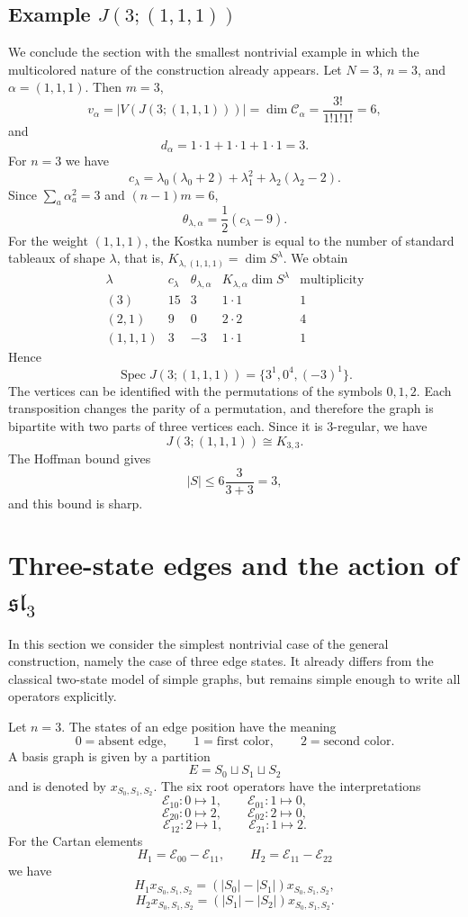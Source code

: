 \documentclass[12pt,reqno]{amsart}
\begin{document}
\subsection{Example $J(3;(1,1,1))$}
We conclude the section with the smallest nontrivial example in which the
multicolored nature of the construction already appears.
Let $N=3$, $n=3$, and $\alpha=(1,1,1)$. Then $m=3$,
$$
v_\alpha
=
|V(J(3;(1,1,1)))|
=
\dim\mathcal C_\alpha
=
\frac{3!}{1!1!1!}=6,
$$
and
$$
d_\alpha=1\cdot1+1\cdot1+1\cdot1=3.
$$
For $n=3$ we have
$$
c_\lambda
=
\lambda_0(\lambda_0+2)+
\lambda_1^2+
\lambda_2(\lambda_2-2).
$$
Since $\sum_a\alpha_a^2=3$ and $(n-1)m=6$,
$$
\theta_{\lambda,\alpha}
=
\frac12(c_\lambda-9).
$$
For the weight $(1,1,1)$, the Kostka number is equal to the number of
standard tableaux of shape $\lambda$, that is,
$K_{\lambda,(1,1,1)}=\dim S^\lambda$. We obtain
$$
\begin{array}{c|c|c|c|c}
\lambda & c_\lambda & \theta_{\lambda,\alpha}
& K_{\lambda,\alpha}\dim S^\lambda & \text{multiplicity}\\ \hline
(3) & 15 & 3 & 1\cdot1 & 1\\
(2,1) & 9 & 0 & 2\cdot2 & 4\\
(1,1,1) & 3 & -3 & 1\cdot1 & 1
\end{array}
$$
Hence
$$
\operatorname{Spec}J(3;(1,1,1))
=
\{3^1,0^4,(-3)^1\}.
$$
The vertices can be identified with the permutations of the symbols
$0,1,2$. Each transposition changes the parity of a permutation, and
therefore the graph is bipartite with two parts of three vertices each.
Since it is $3$-regular, we have
$$
J(3;(1,1,1))\cong K_{3,3}.
$$
The Hoffman bound gives
$$
|S|
\le
6\frac{3}{3+3}=3,
$$
and this bound is sharp.


\section{Three-state edges and the action of $\mathfrak{sl}_3$}
\label{sl3}
In this section we consider the simplest nontrivial case of the general
construction, namely the case of three edge states. It already differs
from the classical two-state model of simple graphs, but remains simple
enough to write all operators explicitly.

Let $n=3$. The states of an edge position have the meaning
$$
0=\text{absent edge},
\qquad
1=\text{first color},
\qquad
2=\text{second color}.
$$
A basis graph is given by a partition
$$
E=S_0\sqcup S_1\sqcup S_2
$$
and is denoted by $x_{S_0,S_1,S_2}$. The six root operators have the
interpretations
$$
\mathcal E_{10}:0\mapsto1,
\qquad
\mathcal E_{01}:1\mapsto0,
$$
$$
\mathcal E_{20}:0\mapsto2,
\qquad
\mathcal E_{02}:2\mapsto0,
$$
$$
\mathcal E_{12}:2\mapsto1,
\qquad
\mathcal E_{21}:1\mapsto2.
$$
For the Cartan elements
$$
H_1=\mathcal E_{00}-\mathcal E_{11},
\qquad
H_2=\mathcal E_{11}-\mathcal E_{22}
$$
we have
$$
H_1x_{S_0,S_1,S_2}
=(|S_0|-|S_1|)x_{S_0,S_1,S_2},
$$
$$
H_2x_{S_0,S_1,S_2}
=(|S_1|-|S_2|)x_{S_0,S_1,S_2}.
$$
\end{document}
